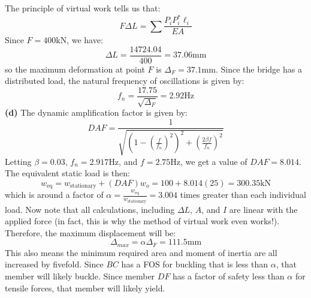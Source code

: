 \documentclass{article}
\begin{document}
The principle of virtual work tells us that:
\begin{equation}
  F\Delta L =  \sum \frac{P_iP_i^* \ell_i}{EA}
  \label{eq:}
\end{equation}
Since $F=400 \si{\kilo\newton}$, we have:
\begin{equation}
  \Delta L = \frac{14724.04}{400} = 37.06 \si{\milli\meter}
  \label{eq:}
\end{equation}
so the maximum deformation at point $F$ is $\boxed{\Delta_F = 37.1\si{\milli\meter}}$.
Since the bridge has a distributed load, the natural frequency of oscillations is given by:
\begin{equation}
  f_n = \frac{17.75}{\sqrt{\Delta_F}} = \boxed{2.92\si{\hertz}}
  \label{eq:}
\end{equation}
\textbf{(d)} The dynamic amplification factor is given by:
\begin{equation}
  DAF = \frac{1}{\sqrt{\left(1-\left(\frac{f}{f_n}\right)^2\right)^2+\left(\frac{2\beta f}{f_n}\right)^2}}
  \label{eq:}
\end{equation}
Letting $\beta=0.03$, $f_n=2.917\si{\hertz}$, and $f=2.75\si{\hertz}$, we get a value of $DAF=8.014$. The equivalent static load is then:
\begin{equation}
  w_\text{eq} = w_\text{stationary} + (DAF)w_o = 100 + 8.014(25)=300.35\si{\kilo\newton}
  \label{eq:}
\end{equation}
which is around a factor of $\alpha = \frac{w_\text{eq}}{w_\text{stationary}} = 3.004$ times greater than each individual load. Now note that all calculations, including $\Delta L$, $A$, and $I$ are linear with the applied force (in fact, this is why the method of virtual work even works!). Therefore, the maximum displacement will be:
\begin{equation}
  \Delta_{max} = \alpha \Delta_F = \boxed{111.5\si{\milli\meter}}
  \label{eq:}
\end{equation}
This also means the minimum required area and moment of inertia are all increased by fivefold. Since $BC$ has a FOS for buckling that is less than $\alpha$, that member will likely buckle. Since member $DF$ has a factor of safety less than $\alpha$ for tensile forces, that member will likely yield.
\end{document}
